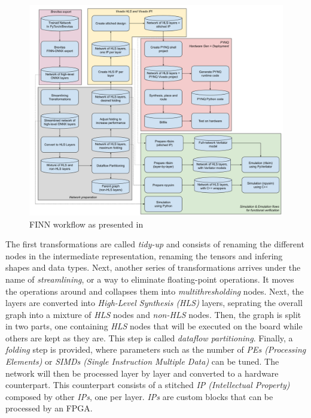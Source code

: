 \begin{figure}[htbp]
	\centering
		\includegraphics[width=\textwidth]{Figures/FinnWorkflow.png}
	\caption[Inference Optimisations]{FINN workflow as presented in \cite{Umuroglu2017, Blott2018}}
	\label{fig:FinnWorkflow}
\end{figure}

The first transformations are called \emph{tidy-up} and consists of renaming the different nodes in the intermediate representation, renaming the tensors and infering shapes and data types. Next, another series of transformations arrives under the name of \emph{streamlining}, or a way to eliminate floating-point operations. It moves the operations around and collapses them into \emph{multithresholding} nodes. Next, the layers are converted into \emph{High-Level Synthesis (HLS)} layers, seprating the overall graph into a mixture of \emph{HLS} nodes and \emph{non-HLS} nodes. Then, the graph is split in two parts, one containing \emph{HLS} nodes that will be executed on the board while others are kept as they are. This step is called \emph{dataflow partitioning}. Finally, a \emph{folding} step is provided, where parameters such as the number of \emph{PEs (Processing Elements)} or \emph{SIMDs (Single Instruction Multiple Data)} can be tuned. The network will then be processed layer by layer and converted to a hardware counterpart. This counterpart consists of a stitched \emph{IP (Intellectual Property)} composed by other \emph{IPs}, one per layer. \emph{IPs} are custom blocks that can be processed by an FPGA.

